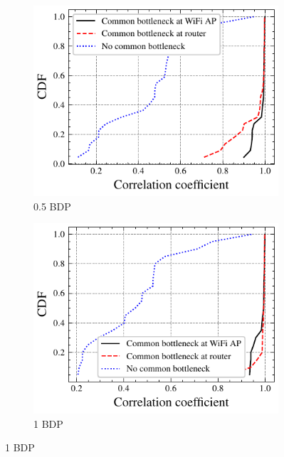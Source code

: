 \begin{figure}
  \centering
  \begin{subfigure}{0.49\textwidth}
    \centering
    \includegraphics[width=\textwidth]{figures/bdp/double-cdf-bdp-05-no-only-video.pdf}
    \caption{\label{subfig:bdp-10}0.5 BDP}
  \end{subfigure}%
  \hfill
  \begin{subfigure}{0.49\textwidth}
    \centering
    \includegraphics[width=\textwidth]{figures/bdp/double-cdf-bdp-10-no-only-video.pdf}
    \caption{\label{subfig:bdp-10}1 BDP}
  \end{subfigure}%
  \vspace{1ex}

\end{figure}
